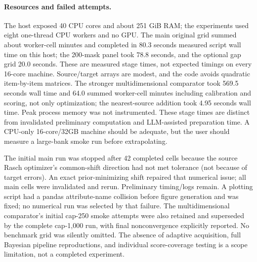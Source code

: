 \paragraph{Resources and failed attempts.}
The host exposed 40 CPU cores and about 251 GiB RAM; the experiments used eight one-thread CPU workers and no GPU. The main original grid summed about \CoreCellMinutes{} worker-cell minutes and completed in 80.3 seconds measured script wall time on this host; the 200-mask panel took 78.8 seconds, and the optional gap grid 20.0 seconds. These are measured stage times, not expected timings on every 16-core machine. Source/target arrays are modest, and the code avoids quadratic item-by-item matrices. The stronger multidimensional comparator took 569.5 seconds wall time and 64.0 summed worker-cell minutes including calibration and scoring, not only optimization; the nearest-source addition took 4.95 seconds wall time. Peak process memory was not instrumented. These stage times are distinct from invalidated preliminary computation and LLM-assisted preparation time. A CPU-only 16-core/32GB machine should be adequate, but the user should measure a large-bank smoke run before extrapolating.

The initial main run was stopped after 42 completed cells because the source Rasch optimizer's common-shift direction had not met tolerance (not because of target errors). An exact prior-minimizing shift repaired that numerical issue; all main cells were invalidated and rerun. Preliminary timing/logs remain. A plotting script had a pandas attribute-name collision before figure generation and was fixed; no numerical run was selected by that failure. The multidimensional comparator's initial cap-250 smoke attempts were also retained and superseded by the complete cap-1,000 run, with final nonconvergence explicitly reported. No benchmark grid was silently omitted. The absence of adaptive acquisition, full Bayesian pipeline reproductions, and individual score-coverage testing is a scope limitation, not a completed experiment.

